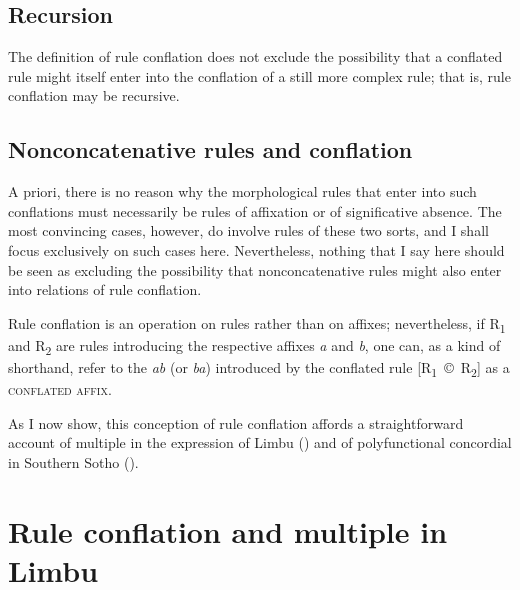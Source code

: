 \documentclass[output=paper,
modfonts
]{LSP/langsci}
\begin{document}
\subsection{Recursion}

The definition of rule conflation does not exclude the possibility that a conflated rule might itself enter into the conflation of a still more complex rule; that is, rule conflation may be recursive.

\subsection{Nonconcatenative rules and conflation}

A priori, there is no reason why the morphological rules that enter into such conflations must necessarily be rules of affixation or of significative absence.  The most convincing cases, however, do involve rules of these two sorts, and I shall focus exclusively on such cases here.  Nevertheless, nothing that I say here should be seen as excluding the possibility that nonconcatenative rules might also enter into relations of rule conflation.

Rule conflation is an operation on rules rather than on affixes; nevertheless, if R\textsubscript{1} and R\textsubscript{2} are rules introducing the respective affixes \textit{a} and \textit{b}, one can, as a kind of shorthand, refer to the  \textit{ab} (or \textit{ba}) introduced by the conflated rule [R\textsubscript{1}~©~R\textsubscript{2}] as a \textsc{conflated affix.}

As I now show, this conception of rule conflation affords a straightforward account of multiple  in the expression of Limbu   () and of polyfunctional concordial  in Southern Sotho ().  

\section{Rule conflation and multiple  in Limbu}\label{sec:stump:5}
\end{document}
